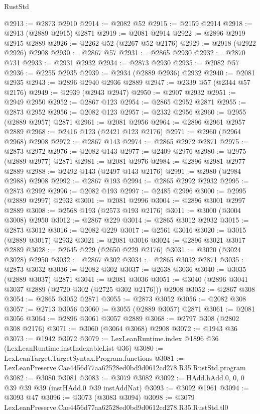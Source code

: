 \begin{lexlean}{RustStd}
\begin{coremodule}
@2913 := @2873 @2910
@2914 := @2082 @52
@2915 := @2159 @2914
@2918 := @2913 (@2889 @2915) @2871
@2919 := @2081 @2914
@2922 := @2896 @2919 @2915 @2889
@2926 := @2262 @52 (@2267 @52 @2176)
@2929 := @2918 (@2922 @2926) @2908
@2930 := @2867 @57
@2931 := @2865 @2930
@2932 := @2870 @731
@2933 := @2931 @2932
@2934 := @2873 @2930
@2935 := @2082 @57
@2936 := @2255 @2935
@2939 := @2934 (@2889 @2936) @2932
@2940 := @2081 @2935
@2943 := @2896 @2940 @2936 @2889
@2947 := @2339 @57 (@2344 @57 @2176)
@2949 := @2939 (@2943 @2947)
@2950 := @2907 @2932
@2951 := @2949 @2950
@2952 := @2867 @123
@2954 := @2865 @2952 @2871
@2955 := @2873 @2952
@2956 := @2082 @123
@2957 := @2332 @2956
@2960 := @2955 (@2889 @2957) @2871
@2961 := @2081 @2956
@2964 := @2896 @2961 @2957 @2889
@2968 := @2416 @123 (@2421 @123 @2176)
@2971 := @2960 (@2964 @2968) @2908
@2972 := @2867 @143
@2974 := @2865 @2972 @2871
@2975 := @2873 @2972
@2976 := @2082 @143
@2977 := @2409 @2976
@2980 := @2975 (@2889 @2977) @2871
@2981 := @2081 @2976
@2984 := @2896 @2981 @2977 @2889
@2988 := @2492 @143 (@2497 @143 @2176)
@2991 := @2980 (@2984 @2988) @2908
@2992 := @2867 @193
@2994 := @2865 @2992 @2932
@2995 := @2873 @2992
@2996 := @2082 @193
@2997 := @2485 @2996
@3000 := @2995 (@2889 @2997) @2932
@3001 := @2081 @2996
@3004 := @2896 @3001 @2997 @2889
@3008 := @2568 @193 (@2573 @193 @2176)
@3011 := @3000 (@3004 @3008) @2950
@3012 := @2867 @229
@3014 := @2865 @3012 @2932
@3015 := @2873 @3012
@3016 := @2082 @229
@3017 := @2561 @3016
@3020 := @3015 (@2889 @3017) @2932
@3021 := @2081 @3016
@3024 := @2896 @3021 @3017 @2889
@3028 := @2645 @229 (@2650 @229 @2176)
@3031 := @3020 (@3024 @3028) @2950
@3032 := @2867 @302
@3034 := @2865 @3032 @2871
@3035 := @2873 @3032
@3036 := @2082 @302
@3037 := @2638 @3036
@3040 := @3035 (@2889 @3037) @2871
@3041 := @2081 @3036
@3051 := @3040 (@2896 @3041 @3037 @2889 (@2720 @302 (@2725 @302 @2176))) @2908
@3052 := @2867 @308
@3054 := @2865 @3052 @2871
@3055 := @2873 @3052
@3056 := @2082 @308
@3057 := @2713 @3056
@3060 := @3055 (@2889 @3057) @2871
@3061 := @2081 @3056
@3064 := @2896 @3061 @3057 @2889
@3068 := @2797 @308 (@2802 @308 @2176)
@3071 := @3060 (@3064 @3068) @2908
@3072 := @1943 @36
@3073 := @1942 @3072
@3079 := LexLeanRuntime.index @1896 @36 (LexLeanRuntime.instIndexableList @36)
@3080 := LexLeanTarget.TargetSyntax.Program.functions
@3081 := LexLeanPreserve.Cae4456d77aa62528ed0bd9d0612cd278.R35.RustStd.program
@3082 := @3080 @3081
@3083 := @3079 @3082
@3092 := HAdd.hAdd.{0, 0, 0} @39 @39 @39 (instHAdd.{0} @39 instAddNat)
@3093 := @3092 @1961
@3094 := @3093 @47
@3096 := @3073 (@3083 @3094)
@3098 := @3079 LexLeanPreserve.Cae4456d77aa62528ed0bd9d0612cd278.R35.RustStd.tl0

\end{coremodule}
\end{lexlean}
